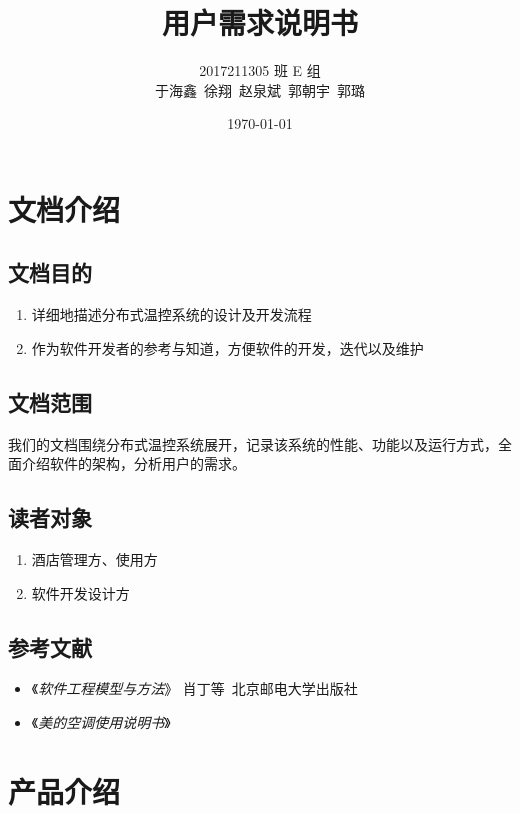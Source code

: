 \documentclass[blue,normal,cn]{elegantnote}
\title{用户需求说明书}
\date{\today}
\begin{document}
\author{
	\begin{tabular}[t]{c}
		2017211305 班 E 组 \\
		于海鑫\ 徐翔\ 赵泉斌\ 郭朝宇\ 郭璐
	\end{tabular}
}
\maketitle

\tableofcontents

\section{文档介绍}

\subsection{文档目的}
\begin{enumerate}
	\item 详细地描述分布式温控系统的设计及开发流程
	\item 作为软件开发者的参考与知道，方便软件的开发，迭代以及维护
\end{enumerate}

\subsection{文档范围}
我们的文档围绕分布式温控系统展开，记录该系统的性能、功能以及运行方式，全面介绍软件的架构，分析用户的需求。

\subsection{读者对象}
\begin{enumerate}
	\item 酒店管理方、使用方
	\item 软件开发设计方
\end{enumerate}

\subsection{参考文献}

\begin{itemize}
	\item 《\emph{软件工程模型与方法}》 肖丁等\ 北京邮电大学出版社
	\item 《\emph{美的空调使用说明书}》
\end{itemize}

\section{产品介绍}
\end{document}

